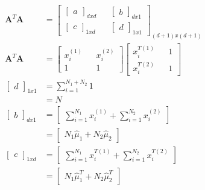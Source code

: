 \documentclass[11pt]{article}
\begin{document}
\begin{enumerate}[label=(\alph*)]
\begin{enumerate}[label=(\roman*)]
\begin{align*}
 \mathbf{A}^T \mathbf{A}  &=
\begin{bmatrix}
\begin{bmatrix}
a
\end{bmatrix}_{dxd}  && 
\begin{bmatrix}
b
\end{bmatrix}_{dx1} 
\\
\begin{bmatrix}
c
\end{bmatrix}_{1xd} && 
\begin{bmatrix}
d
\end{bmatrix}_{1x1} 
\end{bmatrix}_{(d+1)x(d+1)}  
\\
 \mathbf{A}^T \mathbf{A}  &=
\begin{bmatrix}
x_i^{(1)} && x_i^{(2)} \\
1 && 1
\end{bmatrix}
\begin{bmatrix}
x_i^{T(1)} && 1 \\
x_i^{T(2)} && 1
\end{bmatrix} \\
\begin{bmatrix}
d
\end{bmatrix}_{1x1} &= \sum_{i=1}^{N_1+N_2}1 \\
&= N \\
\begin{bmatrix}
b
\end{bmatrix}_{dx1} &= 
\begin{bmatrix}
\sum_{i=1}^{N_1}{x_i^{(1)}} + \sum_{i=1}^{N_2}{x_i^{(2)}}
\end{bmatrix} \\
 &= 
\begin{bmatrix}
N_1\hat{\mu}_1 +N_2\hat{\mu}_2
\end{bmatrix} \\
\begin{bmatrix}
c
\end{bmatrix}_{1xd} &= 
\begin{bmatrix}
\sum_{i=1}^{N_1}{x_i^{T(1)}} + \sum_{i=1}^{N_2}{x_i^{T(2)}}
\end{bmatrix} \\
 &= 
\begin{bmatrix}
N_1\hat{\mu}_1^T +N_2\hat{\mu}_2^T
\end{bmatrix} \\
\end{align*}


\end{enumerate}
\end{enumerate}
\end{document}
